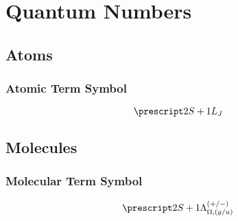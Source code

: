 \chapter{Quantum Numbers}
\label{c:quantum_numbers}

\section{Atoms}
\label{s:atoms}

\subsection{Atomic Term Symbol}

\begin{equation*}
    \state{2S + 1}{L_{J}}
\end{equation*}

\section{Molecules}
\label{s:molecules}

\subsection{Molecular Term Symbol}

\begin{equation*}
    \state{2S + 1}{\Lambda_{\Omega, (g/u)}^{(+/-)}}
\end{equation*}
